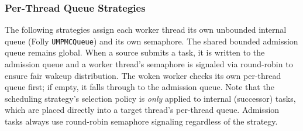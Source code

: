 \subsubsection{Per-Thread Queue Strategies}

The following strategies assign each worker thread its own unbounded internal queue (Folly \texttt{UMPMCQueue}) and its own semaphore.
The shared bounded admission queue remains global.
When a source submits a task, it is written to the admission queue and a worker thread's semaphore is signaled via round-robin to ensure fair wakeup distribution.
The woken worker checks its own per-thread queue first; if empty, it falls through to the admission queue.
Note that the scheduling strategy's selection policy is \emph{only} applied to internal (successor) tasks, which are placed directly into a target thread's per-thread queue.
Admission tasks always use round-robin semaphore signaling regardless of the strategy.

